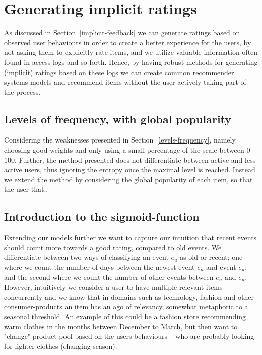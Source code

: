 \section{Generating implicit ratings}

As discussed in Section~\ref{implicit-feedback} we can generate ratings based
on observed user behaviours in order to create a better experience for the
users, by not asking them to explicitly rate items, and we utilize valuable
information often found in access-logs and so forth. Hence, by having robust
methods for generating (implicit) ratings based on these logs we can create
common recommender systems models and recommend items without the user actively
taking part of the process.

\subsection{Levels of frequency, with global popularity}

Considering the weaknesses presented in Section~\ref{levels-frequency}, namely
choosing good weights and only using a small percentage of the scale between
0-100. Further, the method presented does not differentiate between active and
less active users, thus ignoring the entropy once the maximal level is reached.
Instead we extend the method by considering the global popularity of each item,
so that the user that.. 

\subsection{Introduction to the sigmoid-function}

Extending our models further we want to capture our intuition that recent
events should count more towards a good rating, compared to old events. We
differentiate between two ways of classifying an event $e_u$ as old or recent;
one where we count the number of days between the newest event $e_n$ and event
$e_u$; and the second where we count the number of other events between $e_n$
and $e_u$. However, intuitively we consider a user to have multiple relevant
items concurrently and we know that in domains such as technology, fashion and
other consumer-products an item has an ago of relevancy, somewhat metaphoric to
a seasonal threshold. An example of this could be a fashion store recommending
warm clothes in the months between December to March, but then want to "change"
product pool based on the users behaviours – who are probably looking for
lighter clothes (changing season).

